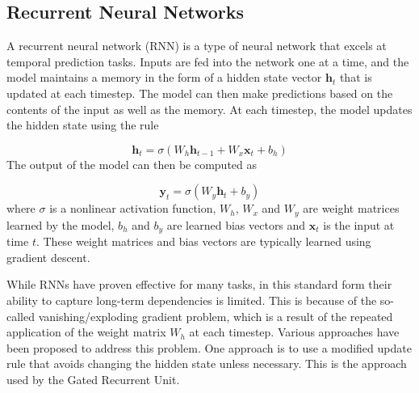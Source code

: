 \subsection*{Recurrent Neural Networks}

A recurrent neural network (RNN) is a type of neural network that excels at temporal prediction tasks. Inputs are fed into the network one at a time, and the model maintains a memory in the form of a hidden state vector \(\mathbf{h}_t\) that is updated at each timestep. The model can then make predictions based on the contents of the input as well as the memory. At each timestep, the model updates the hidden state using the rule

\[ \mathbf{h}_t = \sigma(W_h \mathbf{h}_{t-1} + W_x \mathbf{x}_t + b_h) \]
The output of the model can then be computed as

\[ \mathbf{y}_t = \sigma(W_y \mathbf{h}_t + b_y) \]
where \(\sigma\) is a nonlinear activation function, \(W_h\), \(W_x\) and \(W_y\) are weight matrices learned by the model, \(b_h\) and \(b_y\) are learned bias vectors and \(\mathbf{x}_t\) is the input at time \(t\). These weight matrices and bias vectors are typically learned using gradient descent.

While RNNs have proven effective for many tasks, in this standard form their ability to capture long-term dependencies is limited. This is because of the so-called vanishing/exploding gradient problem, which is a result of the repeated application of the weight matrix \(W_h\) at each timestep.
Various approaches have been proposed to address this problem. One approach is to use a modified update rule that avoids changing the hidden state unless necessary. This is the approach used by the Gated Recurrent Unit.